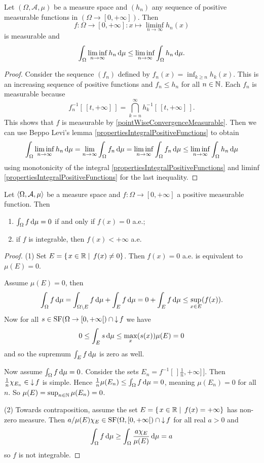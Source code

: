 \begin{proposition} \label{FatouLemma}
Let $(\Omega, \mathcal{A}, \mu)$ be a measure space and $(h_n)$ any sequence of positive measurable functions in $(\Omega\to[0,+\infty])$. Then
\[ f: \Omega\to[0,+\infty]: x\mapsto \liminf_{n\to\infty}h_n(x) \]
is measurable and
\[ \int_\Omega \liminf_{n\to\infty}h_n\operatorname{d \!}{\mu} \leq \liminf_{n\to\infty}\int_\Omega h_n\operatorname{d \!}{\mu}. \]
\end{proposition}
\begin{proof}
Consider the sequence $(f_n)$ defined by $f_n(x) = \inf_{k\geq n}h_k(x)$. This is an increasing sequence of positive functions and $f_n \leq h_n$ for all $n\in\mathbb{N}$. Each $f_n$ is measurable because
\[ f_n^{-1}[\,[t,+\infty]\,] = \bigcap_{k=n}^\infty h_k^{-1}[\,[t,+\infty]\,]. \]
This shows that $f$ is measurable by \ref{pointWiseConvergenceMeasurable}. Then we can use Beppo Levi's lemma \ref{propertiesIntegralPositiveFunctions} to obtain
\[ \int_\Omega\liminf_{n\to\infty}h_n\operatorname{d \!}{\mu} = \lim_{n\to\infty}\int_\Omega f_n\operatorname{d \!}{\mu} = \liminf_{n\to\infty}\int_\Omega f_n\operatorname{d \!}{\mu} \leq \liminf_{n\to\infty}\int_\Omega h_n\operatorname{d \!}{\mu} \]
using monotonicity of the integral \ref{propertiesIntegralPositiveFunctions} and liminf \ref{propertiesIntegralPositiveFunctions} for the last inequality.
\end{proof}

\begin{proposition}
Let $\left\langle \Omega, \mathcal{A}, \mu \right\rangle$ be a measure space and $f:\Omega\to[0,+\infty]$ a positive measurable function. Then
\begin{enumerate}
\item $\int_\Omega f\operatorname{d \!}{\mu} = 0$ \textup{if and only if} $f(x) = 0$ a.e.;
\item if $f$ is integrable, then $f(x)< +\infty$ a.e.
\end{enumerate}
\end{proposition}
\begin{proof}(1) Set $E = \left\{\left. x\in\mathbb{R} \;\right|\; f(x) \neq 0 \right\}$. Then $f(x) = 0$ a.e. is equivalent to $\mu(E) = 0$.

Assume $\mu(E) = 0$, then 
\[ \int_\Omega f\operatorname{d \!}{\mu} = \int_{\Omega\setminus E} f\operatorname{d \!}{\mu} + \int_E f\operatorname{d \!}{\mu} = 0+\int_E f\operatorname{d \!}{\mu} \leq \sup_{x\in E}(f(x)). \]
Now for all $s\in\operatorname{SF}(\Omega\to [0,+\infty[)\cap \mathop{\downarrow} f$ we have
\[ 0\leq \int_E s \operatorname{d \!}{\mu}\leq \max_x(s(x))\mu(E) = 0  \]
and so the supremum $\int_E f\operatorname{d \!}{\mu}$ is zero as well.

Now assume $\int_\Omega f\operatorname{d \!}{\mu} = 0$. Consider the sets $E_n = f^{-1}[\,]\frac{1}{n},+\infty]\,]$. Then $\frac{1}{n}\chi_{E_n}\in \mathop{\downarrow} f$ is simple. Hence $\frac{1}{n}\mu(E_n)\leq \int_\Omega f\operatorname{d \!}{\mu} = 0$, meaning $\mu(E_n) = 0$ for all $n$. So $\mu(E) = \sup_{n\in\mathbb{N}}\mu(E_n) = 0$.

(2) Towards contraposition, assume the set $E = \left\{\left. x\in\mathbb{R} \;\right|\; f(x) = +\infty \right\}$ has non-zero measure. Then $a/\mu(E)\chi_E\in\operatorname{SF}(\Omega, [0,+\infty[)\cap \mathop{\downarrow} f$ for all real $a>0$ and
\[  \int_\Omega f\operatorname{d \!}{\mu} \geq \int_\Omega \frac{a\chi_E}{\mu(E)}\operatorname{d \!}{\mu} = a  \]
so $f$ is not integrable.
\end{proof}


